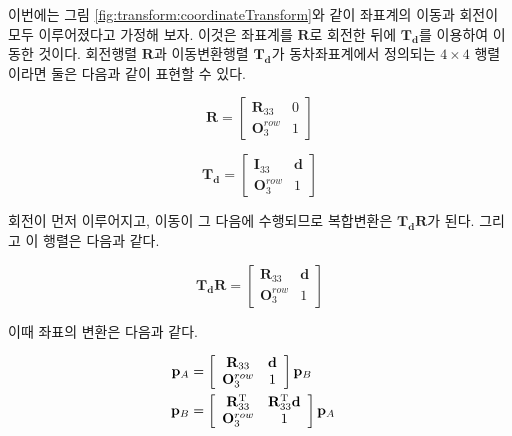 이번에는 그림 \ref{fig:transform:coordinateTransform}와 같이 좌표계의 이동과 회전이 모두 이루어졌다고 가정해 보자.
이것은 좌표계를 $\mathbf R$로 회전한 뒤에 $\mathbf T_{\mathbf d}$를 이용하여 이동한 것이다.
회전행렬 $\mathbf R$과 이동변환행렬 $\mathbf T_{\mathbf d}$가 동차좌표계에서 정의되는 $4 \times 4$ 행렬이라면
둘은 다음과 같이 표현할 수 있다.

$$ 
\mathbf R = \left [ \begin{array}{cc} \mathbf R_{33} & 0 \\ \mathbf O_3^{row}  & 1 \end{array} \right ]
$$

$$ 
\mathbf T_{\mathbf d} = \left [ \begin{array}{cc} \mathbf I_{33} & \mathbf d \\ \mathbf O_3^{row} & 1 \end{array} \right ]
$$

회전이 먼저 이루어지고, 이동이 그 다음에 수행되므로 복합변환은 $\mathbf T_{\mathbf d} \mathbf R$가 된다.
그리고 이 행렬은 다음과 같다.

$$ 
\mathbf T_{\mathbf d} \mathbf R = \left [ \begin{array}{cc} \mathbf R_{33} & \mathbf d \\ \mathbf O_3^{row} & 1 \end{array} \right ]
$$

이때 좌표의 변환은 다음과 같다.



\begin{eqnarray}
\mathbf p_A &= 
\left [ \begin{array}{cc} \mathbf R_{33} & \mathbf d \\ \mathbf O_3^{row} & 1 \end{array} \right ]
\mathbf p_B &\\ \nonumber
\mathbf p_B &=  
\left [ \begin{array}{cc} \mathbf R_{33}^{\rm T} &  \mathbf R_{33}^{\rm T} \mathbf d \\ \mathbf O_3^{row} & 1 \end{array} \right ]
\mathbf p_A  \\ \nonumber
\end{eqnarray}
